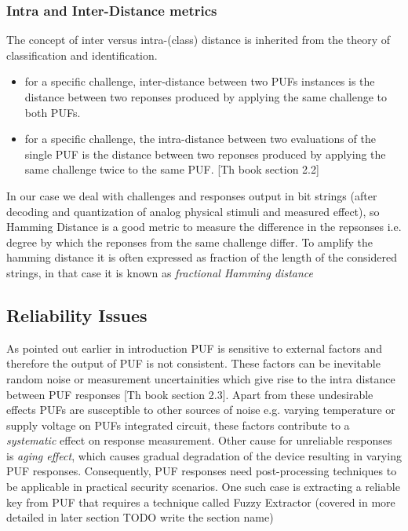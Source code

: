 \subsubsection{Intra and Inter-Distance metrics}
The concept of inter versus intra-(class) distance is inherited from the theory of classification and identification.
\begin{itemize}
	\item for a specific challenge, inter-distance between two PUFs instances is the distance between two reponses produced by applying the same challenge to both PUFs.
	\item for a specific challenge, the intra-distance between two evaluations of the single PUF is the distance between two reponses produced by applying the same challenge twice to the same PUF. [Th book section 2.2]
\end{itemize}

In our case we deal with challenges and responses output in bit strings (after decoding and quantization of analog physical stimuli and measured effect), so Hamming Distance is a good metric to measure the difference in the repsonses i.e. degree by which the reponses from the same challenge differ. To amplify the hamming distance it is often expressed as fraction of the length of the considered strings, in that case it is known as \emph{fractional Hamming distance}

\subsection{Reliability Issues}
As pointed out earlier in introduction PUF is sensitive to external factors and therefore the output of PUF is not consistent. These factors can be inevitable random noise or measurement uncertainities which give rise to the intra distance between PUF responses [Th book section 2.3]. Apart from these undesirable effects PUFs are susceptible to other sources of noise e.g. varying temperature or supply voltage on PUFs integrated circuit, these factors contribute to a \emph{systematic} effect on response measurement. Other cause for unreliable responses is \emph{aging effect}, which causes gradual degradation of the device resulting in varying PUF responses. Consequently, PUF responses need post-processing techniques to be applicable in practical security scenarios. One such case is extracting a reliable key from PUF that requires a technique called Fuzzy Extractor (covered in more detailed in later section TODO write the section name)

